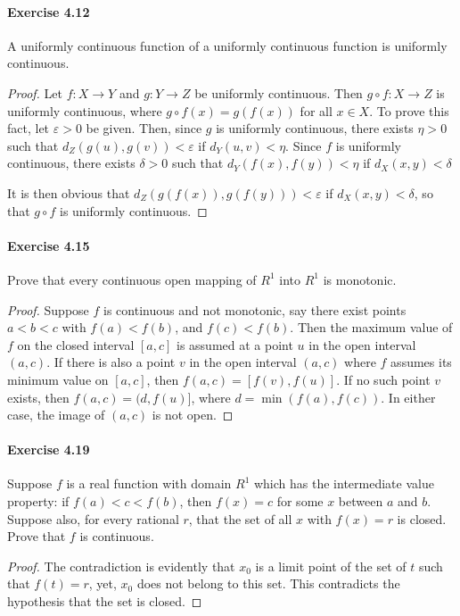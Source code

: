 \documentclass{article}
\theoremstyle{definition}
\begin{document}
\paragraph{Exercise 4.12} A uniformly continuous function of a uniformly continuous function is uniformly continuous.
\begin{proof}
    Let $f: X \rightarrow Y$ and $g: Y \rightarrow Z$ be uniformly continuous. Then $g \circ f: X \rightarrow Z$ is uniformly continuous, where $g \circ f(x)=g(f(x))$ for all $x \in X$.
To prove this fact, let $\varepsilon>0$ be given. Then, since $g$ is uniformly continuous, there exists $\eta>0$ such that $d_Z(g(u), g(v))<\varepsilon$ if $d_Y(u, v)<\eta$. Since $f$ is uniformly continuous, there exists $\delta>0$ such that $d_Y(f(x), f(y))<\eta$ if $d_X(x, y)<\delta$

It is then obvious that $d_Z(g(f(x)), g(f(y)))<\varepsilon$ if $d_X(x, y)<\delta$, so that $g \circ f$ is uniformly continuous.
\end{proof}


\paragraph{Exercise 4.15} Prove that every continuous open mapping of $R^{1}$ into $R^{1}$ is monotonic.
\begin{proof}
    Suppose $f$ is continuous and not monotonic, say there exist points $a<b<c$ with $f(a)<f(b)$, and $f(c)<f(b)$. Then the maximum value of $f$ on the closed interval $[a, c]$ is assumed at a point $u$ in the open interval $(a, c)$. If there is also a point $v$ in the open interval $(a, c)$ where $f$ assumes its minimum value on $[a, c]$, then $f(a, c)=[f(v), f(u)]$. If no such point $v$ exists, then $f(a, c)=(d, f(u)]$, where $d=\min (f(a), f(c))$. In either case, the image of $(a, c)$ is not open.
\end{proof}



\paragraph{Exercise 4.19} Suppose $f$ is a real function with domain $R^{1}$ which has the intermediate value property: if $f(a)<c<f(b)$, then $f(x)=c$ for some $x$ between $a$ and $b$. Suppose also, for every rational $r$, that the set of all $x$ with $f(x)=r$ is closed. Prove that $f$ is continuous.
\begin{proof}
    The contradiction is evidently that $x_0$ is a limit point of the set of $t$ such that $f(t)=r$, yet, $x_0$ does not belong to this set. This contradicts the hypothesis that the set is closed.
\end{proof}
\end{document}
